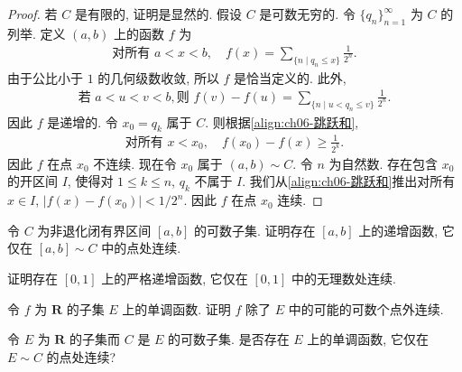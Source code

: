 \documentclass[../../main.tex]{subfiles}
\begin{document}
\begin{proof}
若 $C$ 是有限的, 证明是显然的. 假设 $C$ 是可数无穷的. 令 $\{q_{n}\}_{n=1}^{\infty}$ 为 $C$ 的列举. 定义 $(a,b)$ 上的函数 $f$ 为
\begin{align*}
\text{对所有 }a<x<b,\quad f(x)=\sum_{\{n\mid q_{n}\leqslant x\}}\frac{1}{2^{n}}.
\end{align*}
由于公比小于 $1$ 的几何级数收敛, 所以 $f$ 是恰当定义的. 此外,
\begin{align}
\text{若 }a<u<v<b,\text{则 }f(v)-f(u)=\sum_{\{n\mid u<q_{n}\leqslant v\}}\frac{1}{2^{n}}.\label{align:ch06-跳跃和}
\end{align}
因此 $f$ 是递增的. 令 $x_{0}=q_{k}$ 属于 $C$. 则根据\eqref{align:ch06-跳跃和},
\begin{align*}
\text{对所有 }x<x_{0},\quad f(x_{0})-f(x)\geqslant\frac{1}{2^{k}}.
\end{align*}
因此 $f$ 在点 $x_{0}$ 不连续. 现在令 $x_{0}$ 属于 $(a,b)\sim C$. 令 $n$ 为自然数. 存在包含 $x_{0}$ 的开区间 $I$, 使得对 $1\leqslant k\leqslant n$, $q_{k}$ 不属于 $I$. 我们从\eqref{align:ch06-跳跃和}推出对所有 $x\in I$, $|f(x)-f(x_{0})|<1/2^{n}$. 因此 $f$ 在点 $x_{0}$ 连续.
\end{proof}

\begin{exercise}\label{exercise:ch06-01}
令 $C$ 为非退化闭有界区间 $[a,b]$ 的可数子集. 证明存在 $[a,b]$ 上的递增函数, 它仅在 $[a,b]\sim C$ 中的点处连续.
\end{exercise}

\begin{exercise}\label{exercise:ch06-02}
证明存在 $[0,1]$ 上的严格递增函数, 它仅在 $[0,1]$ 中的无理数处连续.
\end{exercise}

\begin{exercise}\label{exercise:ch06-03}
令 $f$ 为 $\mathbf{R}$ 的子集 $E$ 上的单调函数. 证明 $f$ 除了 $E$ 中的可能的可数个点外连续.
\end{exercise}

\begin{exercise}\label{exercise:ch06-04}
令 $E$ 为 $\mathbf{R}$ 的子集而 $C$ 是 $E$ 的可数子集. 是否存在 $E$ 上的单调函数, 它仅在 $E\sim C$ 的点处连续?
\end{exercise}
\end{document}
